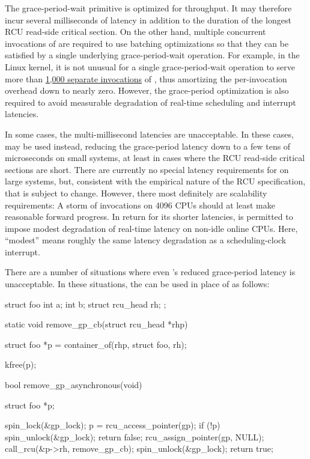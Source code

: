 The  grace-period-wait primitive is optimized for
throughput.
It may therefore incur several milliseconds of latency in
addition to the duration of the longest RCU read-side critical section.
On the other hand, multiple concurrent invocations of
 are required to use batching optimizations so that
they can be satisfied by a single underlying grace-period-wait
operation.
For example, in the Linux kernel, it is not unusual for a
single grace-period-wait operation to serve more than
\href{https://www.usenix.org/conference/2004-usenix-annual-technical-conference/making-rcu-safe-deep-sub-millisecond-response}{1,000 separate invocations}
of , thus amortizing the per-invocation overhead
down to nearly zero.
However, the grace-period optimization is also
required to avoid measurable degradation of real-time scheduling and
interrupt latencies.

In some cases, the multi-millisecond  latencies are
unacceptable.
In these cases,  may be
used instead, reducing the grace-period latency down to a few tens of
microseconds on small systems, at least in cases where the RCU read-side
critical sections are short.
There are currently no special latency
requirements for  on large systems, but,
consistent with the empirical nature of the RCU specification, that is
subject to change.
However, there most definitely are scalability
requirements:
A storm of  invocations on
4096 CPUs should at least make reasonable forward progress.
In return
for its shorter latencies,  is permitted
to impose modest degradation of real-time latency on non-idle online
CPUs.
Here, ``modest'' means roughly the same latency degradation as a
scheduling-clock interrupt.

There are a number of situations where even
's reduced grace-period latency is
unacceptable.
In these situations, the  can
be used in place of  as follows:

\begin{fcvlabel}
\begin{VerbatimN}[commandchars=\%\@\$]
	struct foo {          %
		int a;
		int b;
		struct rcu_head rh;
	};                    %

	static void remove_gp_cb(struct rcu_head *rhp)
	{
		struct foo *p = container_of(rhp, struct foo, rh);

		kfree(p);
	}

	bool remove_gp_asynchronous(void)
	{
		struct foo *p;

		spin_lock(&gp_lock);            %
		p = rcu_access_pointer(gp);     %
		if (!p) {
			spin_unlock(&gp_lock);
			return false;
		}
		rcu_assign_pointer(gp, NULL);
		call_rcu(&p->rh, remove_gp_cb);  %
		spin_unlock(&gp_lock);           %
		return true;
	}
\end{VerbatimN}
\end{fcvlabel}

